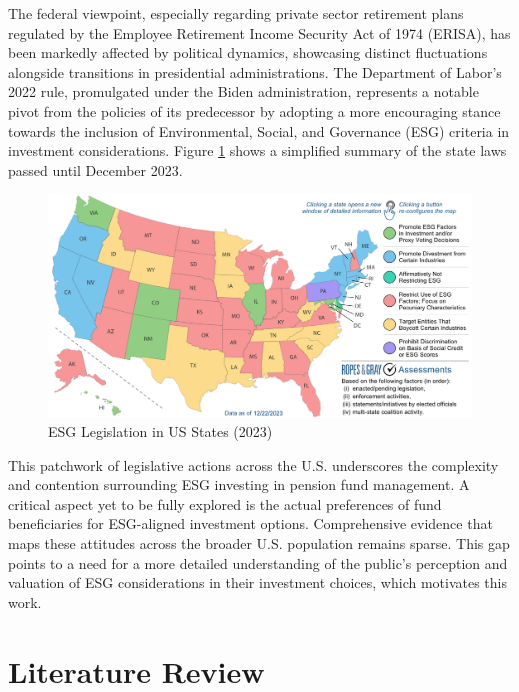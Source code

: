 \documentclass[
  12pt,
]{article}
\begin{document}
The federal viewpoint, especially regarding private sector retirement plans regulated by the Employee Retirement Income Security Act of 1974 (ERISA), has been markedly affected by political dynamics, showcasing distinct fluctuations alongside transitions in presidential administrations. The Department of Labor's 2022 rule, promulgated under the Biden administration, represents a notable pivot from the policies of its predecessor by adopting a more encouraging stance towards the inclusion of Environmental, Social, and Governance (ESG) criteria in investment considerations. Figure \ref{fig:mapplot} shows a simplified summary of the state laws passed until December 2023.

\begin{figure}

{\centering \includegraphics[width=1\textwidth]{ropesandgrey} 

}

\caption{ESG Legislation in US States (2023)}\label{fig:mapplot}
\end{figure}

This patchwork of legislative actions across the U.S. underscores the complexity and contention surrounding ESG investing in pension fund management. A critical aspect yet to be fully explored is the actual preferences of fund beneficiaries for ESG-aligned investment options. Comprehensive evidence that maps these attitudes across the broader U.S. population remains sparse. This gap points to a need for a more detailed understanding of the public's perception and valuation of ESG considerations in their investment choices, which motivates this work.

\hypertarget{literature-review}{%
\section{Literature Review}\label{literature-review}}
\end{document}
